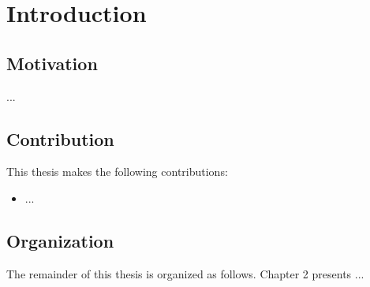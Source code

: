 \chapter{Introduction}
\section{Motivation}

...


\section{Contribution}
This thesis makes the following contributions:
\begin{itemize} 
\item
...

\end{itemize}

\section{Organization}
The remainder of this thesis is organized as follows. Chapter 2 presents ...


\let\cleardoublepage\clearpage